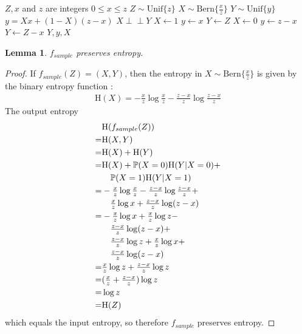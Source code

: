 \documentclass[lettersize,journal]{IEEEtran}
\newtheorem{lemma}{Lemma}
\newcommand{\indep}{\perp\!\!\!\perp}
\newcommand{\unif}[1]{\mathrm{Unif}\{#1\}}
\newcommand{\bern}[1]{\mathrm{Bern}\{#1\}}
\newcommand{\Entropy}{\mathrm{H}}
\newcommand{\entropy}[1]{\Entropy(#1)}
\newcommand{\Prob}{\mathbb{P}}
\newcommand{\prob}[1]{\Prob(#1)}
\begin{document}
\begin{algorithm}
\caption{Converting a uniform variable into a Bernoulli and a uniform variable}
\label{alg:sample}
\begin{algorithmic}[1]
    \Require $Z, x$ and $z$ are integers 
    \Require $0 \le x \le z$
    \Require $Z \sim \unif{z}$
    \Ensure $X \sim \bern{\frac{x}{z}}$
    \Ensure $Y \sim \unif{y}$
    \Ensure $y = Xx + (1-X)(z-x)$
    \Ensure $X \indep Y$
    \State $X \gets 1$  
    \State $y \gets x$
    \State $Y \gets Z$
  \Else
    \State $X \gets 0$  
    \State $y \gets z-x$
    \State $Y \gets Z-x$
  \EndIf
  \State \Return $Y, y, X$
\EndProcedure
\end{algorithmic}
\end{algorithm}

\begin{lemma}
    $f_{sample}$ preserves entropy.
    \label{lem:sample-entropy}
\end{lemma}

\begin{proof}If $f_{sample}(Z) = (X,Y)$, then the entropy in $X \sim \bern{\frac{x}{z}}$ is given by the binary entropy function \cite{cover1999elements}:
    \begin{align}
    \entropy{X} = -\tfrac{x}{z}\log\tfrac{x}{z} - \tfrac{z-x}{z}\log\tfrac{z-x}{z}
    \end{align}
    The output entropy
    \begin{align}
     & \entropy{f_{sample}(Z)} \\ 
                    =& \entropy{X,Y} \\
                    =& \entropy{X} + \entropy{Y} \\
                    =& \entropy{X} + \prob{X=0}\entropy{Y|X=0} + \notag \\
                        & \quad \prob{X=1}\entropy{Y|X=1} \\
                    =& -\tfrac{x}{z}\log\tfrac{x}{z} - \tfrac{z-x}{z}\log\tfrac{z-x}{z} + \notag \\
                        & \quad \tfrac{x}{z}\log{x} + \tfrac{z-x}{z}\log(z-x) \\
                    =& -\tfrac{x}{z}\log x + \tfrac{x}{z}\log z - \notag \\
                        & \quad \tfrac{z-x}{z}\log(z-x) + \notag \\
                        & \quad \tfrac{z-x}{z}\log{z} + \tfrac{x}{z}\log{x} + \notag \\
                        & \quad \tfrac{z-x}{z}\log(z-x) \\
                    =& \tfrac{x}{z}\log z + \tfrac{z-x}{z}\log z \\
                    =& (\tfrac{x}{z} + \tfrac{z-x}{z})\log z \\
                    =& \log z \\
                    =& \entropy{Z}
    \end{align}
    which equals the input entropy, so therefore $f_{sample}$ preserves entropy.
\end{proof}
\end{document}
